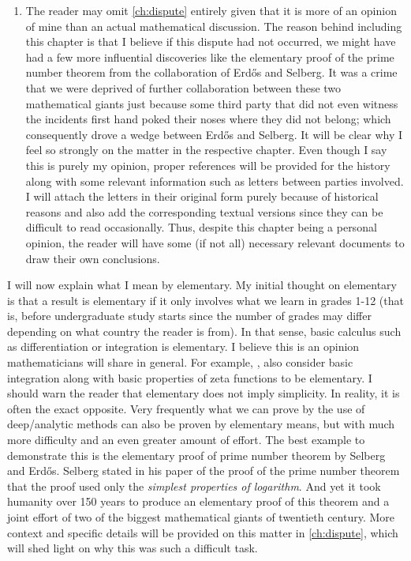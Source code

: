 \documentclass[12pt,leqno]{book}
\theoremstyle{definition}
\begin{document}
\begin{enumerate}[(1)]
			\item The reader may omit \autoref{ch:dispute} entirely given that it is more of an opinion of mine than an actual mathematical discussion. The reason behind including this chapter is that I believe if this dispute had not occurred, we might have had a few more influential discoveries like the elementary proof of the prime number theorem from the collaboration of Erd\H{o}s and Selberg. It was a crime that we were deprived of further collaboration between these two mathematical giants just because some third party that did not even witness the incidents first hand poked their noses where they did not belong; which consequently drove a wedge between Erd\H{o}s and Selberg. It will be clear why I feel so strongly on the matter in the respective chapter. Even though I say this is purely my opinion, proper references will be provided for the history along with some relevant information such as letters between parties involved. I will attach the letters in their original form purely because of historical reasons and also add the corresponding textual versions since they can be difficult to read occasionally. Thus, despite this chapter being a personal opinion, the reader will have some (if not all) necessary relevant documents to draw their own conclusions.
		\end{enumerate}
	I will now explain what I mean by elementary. My initial thought on elementary is that a result is elementary if it only involves what we learn in grades 1-12 (that is, before undergraduate study starts since the number of grades may differ depending on what country the reader is from). In that sense, basic calculus such as differentiation or integration is elementary. I believe this is an opinion mathematicians will share in general. For example, \textcite{landau_1969}, \textcite{ingham_1932} also consider basic integration along with basic properties of zeta functions to be elementary. I should warn the reader that elementary does not imply simplicity. In reality, it is often the exact opposite. Very frequently what we can prove by the use of deep/analytic methods can also be proven by elementary means, but with much more difficulty and an even greater amount of effort. The best example to demonstrate this is the elementary proof of prime number theorem by Selberg and Erd\H{o}s. Selberg stated in his paper of the proof of the prime number theorem that the proof used only the \textit{simplest properties of logarithm}. And yet it took humanity over 150 years to produce an elementary proof of this theorem and a joint effort of two of the biggest mathematical giants of twentieth century. More context and specific details will be provided on this matter in \autoref{ch:dispute},  which will shed light on why this was such a difficult task.
\end{document}
